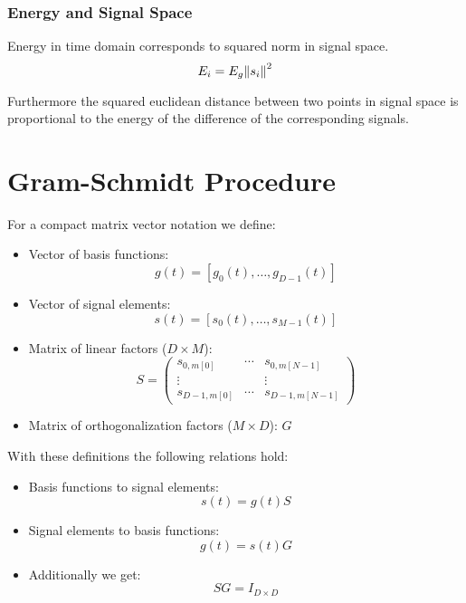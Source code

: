\subsubsection{Energy and Signal Space}
Energy in time domain corresponds to squared norm in signal space.
\begin{equation}
    E_i = E_g \norm{s_i}^2
\end{equation}

Furthermore the squared euclidean distance between two points in signal space is 
proportional to the energy of the difference of the corresponding signals.

\section{Gram-Schmidt Procedure}
For a compact matrix vector notation we define:
\begin{itemize}
    \item Vector of basis functions:
        \begin{equation}
            g(t) = [g_0(t), \ldots, g_{D-1}(t)]
        \end{equation}
    \item Vector of signal elements:
        \begin{equation}
            s(t) = [s_0(t), \ldots, s_{M-1}(t)]
        \end{equation}
    \item Matrix of linear factors ($D \times M$):
        \begin{equation}
            S = 
            \begin{pmatrix}
                s_{0,m[0]} & \cdots  & s_{0,m[N-1]} \\
                \vdots & & \vdots \\
                s_{D-1,m[0]} & \cdots & s_{D-1, m[N-1]}
            \end{pmatrix}
        \end{equation}
    \item Matrix of orthogonalization factors ($M \times D$): $G$
\end{itemize}

With these definitions the following relations hold:
\begin{itemize}
    \item Basis functions to signal elements:
        \begin{equation}
            s(t) = g(t) S
        \end{equation}
    \item Signal elements to basis functions:
        \begin{equation}
            g(t) = s(t) G
        \end{equation}
    \item Additionally we get:
        \begin{equation}
            S G = I_{D \times D}
        \end{equation}
\end{itemize}

